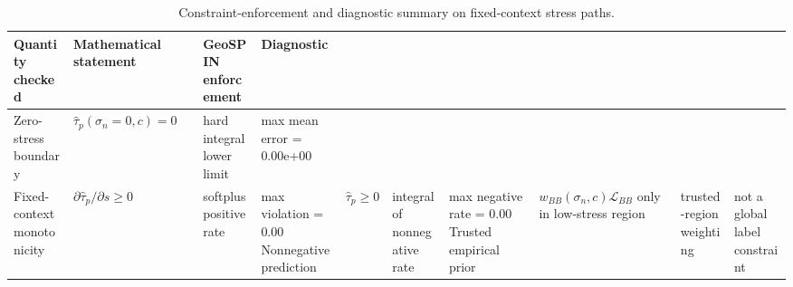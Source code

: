 \begin{table}
\caption{Constraint-enforcement and diagnostic summary on fixed-context stress paths.}
\label{tab:physics_validity_checks}
\begin{tabular}{llll}
\toprule
Quantity checked & Mathematical statement & GeoSPIN enforcement & Diagnostic \\
\midrule
Zero-stress boundary & $\hat{\tau}_p(\sigma_n=0,c)=0$ & hard integral lower limit & max mean error = 0.00e+00 \\
Fixed-context monotonicity & $\partial \hat{\tau}_p/\partial s \ge 0$ & softplus positive rate & max violation = 0.00%
Nonnegative prediction & $\hat{\tau}_p\ge0$ & integral of nonnegative rate & max negative rate = 0.00%
Trusted empirical prior & $w_{BB}(\sigma_n,c)\mathcal{L}_{BB}$ only in low-stress region & trusted-region weighting & not a global label constraint \\
\bottomrule
\end{tabular}
\end{table}
